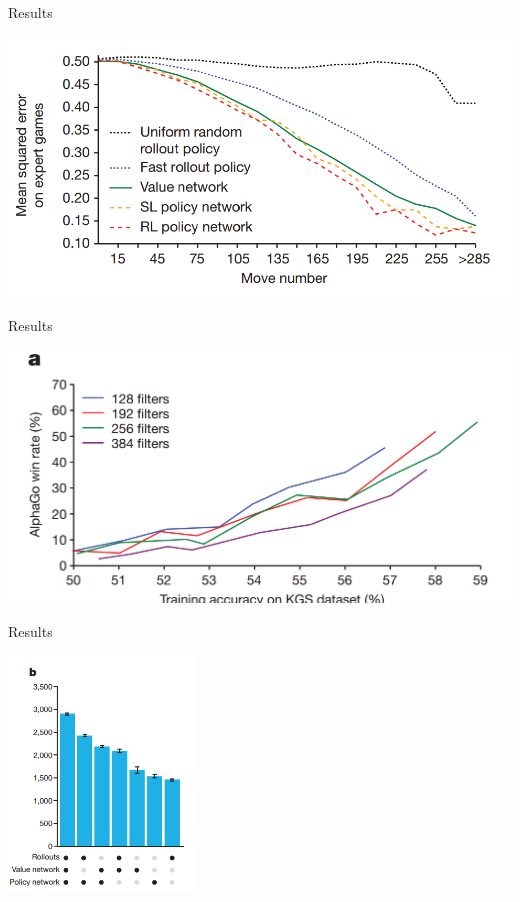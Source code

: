 \documentclass{beamer}
\begin{document}
\begin{frame}{Results}
  \begin{center}
    \includegraphics[width=\textwidth]{alphago/rollout}
  \end{center}
\end{frame}




\begin{frame}{Results}
  \begin{center}
    \includegraphics[width=\textwidth]{alphago/trainacc}
  \end{center}
\end{frame}

\begin{frame}{Results}
  \begin{center}
    \includegraphics[width=5cm]{alphago/perf}
  \end{center}
\end{frame}
\end{document}
